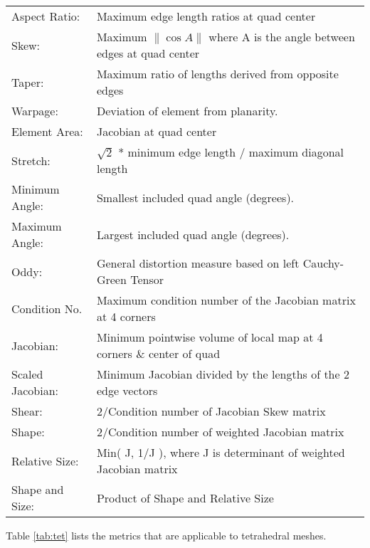 \documentclass[10pt]{report}
\begin{document}
\begin{appendix}
\begin{tabular}{lp{4in}}
Aspect Ratio:     & Maximum edge length ratios at quad center \\
Skew: & Maximum $\|\cos A\|$ where A is the angle between edges at quad center \\
Taper:            & Maximum ratio of lengths derived from opposite edges \\
Warpage:          & Deviation of element from planarity. \\
Element Area:     & Jacobian at quad center \\
Stretch:          & $\sqrt{2}$ * minimum edge length / maximum diagonal length\\
Minimum Angle:    & Smallest included quad angle (degrees).  \\
Maximum Angle:    & Largest included quad angle (degrees).  \\
Oddy:             & General distortion measure based on left Cauchy-Green Tensor \\
Condition No.     & Maximum condition number of the Jacobian matrix at 4 corners \\
Jacobian:         & Minimum pointwise volume of local map at 4 corners \& center of quad \\
Scaled Jacobian:  & Minimum Jacobian divided by the lengths of the 2 edge vectors \\
Shear:             & 2/Condition number of Jacobian Skew matrix \\
Shape:             & 2/Condition number of weighted Jacobian matrix \\
Relative Size:     & Min( J, 1/J ), where J is determinant of weighted Jacobian matrix \\
Shape and Size:    & Product of Shape and Relative Size \\
\end{tabular}
\T\newpage
\htmlrule


Table \ref{tab:tet}
lists the metrics that are applicable to tetrahedral meshes.  


\end{appendix}
\end{document}
